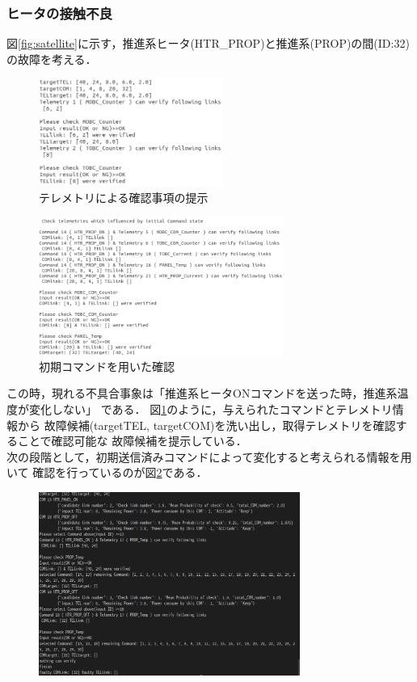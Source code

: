 \documentclass[11pt]{jsarticle}%
\begin{document}
\begin{multicols}{2}
  \subsubsection{ヒータの接触不良}
図\ref{fig:satellite}に示す，推進系ヒータ(HTR\_PROP)と推進系(PROP)の間(ID:32)
の故障を考える．
  \begin{figure}[H]
    \centering
      \includegraphics[width=6.0cm]{../figure/COM14_TEL17_TEL_phase.png}
      \caption{テレメトリによる確認事項の提示}
      \label{fig:TEL_list}
  \end{figure}
  \vspace{-1zh}
  \begin{figure}[H]
    \centering
      \includegraphics[width=8.0cm]{../figure/COM14_TEL17_iniCOM_phase.png}
      \caption{初期コマンドを用いた確認}
      \label{fig:initial_COM}
  \end{figure}
この時，現れる不具合事象は「推進系ヒータONコマンドを送った時，推進系温度が変化しない」
である．
図\ref{fig:TEL_list}のように，与えられたコマンドとテレメトリ情報から
故障候補(targetTEL, targetCOM)を洗い出し，取得テレメトリを確認することで確認可能な
故障候補を提示している．\\
次の段階として，初期送信済みコマンドによって変化すると考えられる情報を用いて
確認を行っているのが図\ref{fig:initial_COM}である．
 \begin{figure}[H]
   \centering
     \includegraphics[height=6.0cm]{../figure/COM14_TEL17_COM_phase.png}

\end{figure}
\end{multicols}
\end{document}
